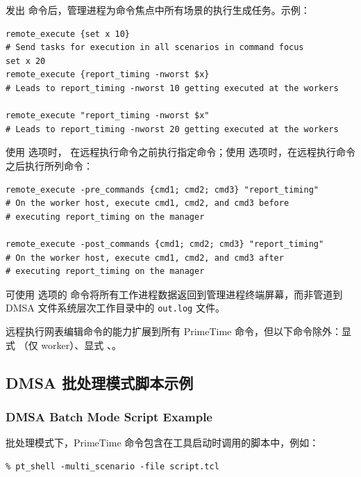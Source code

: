 发出  命令后，管理进程为命令焦点中所有场景的执行生成任务。示例：
\begin{lstlisting}
remote_execute {set x 10}
# Send tasks for execution in all scenarios in command focus
set x 20
remote_execute {report_timing -nworst $x}
# Leads to report_timing -nworst 10 getting executed at the workers

remote_execute "report_timing -nworst $x"
# Leads to report_timing -nworst 20 getting executed at the workers
\end{lstlisting}

使用  选项时， 在远程执行命令之前执行指定命令；使用  选项时，在远程执行命令之后执行所列命令：
\begin{lstlisting}
remote_execute -pre_commands {cmd1; cmd2; cmd3} "report_timing"
# On the worker host, execute cmd1, cmd2, and cmd3 before
# executing report_timing on the manager

remote_execute -post_commands {cmd1; cmd2; cmd3} "report_timing"
# On the worker host, execute cmd1, cmd2, and cmd3 after
# executing report_timing on the manager
\end{lstlisting}

可使用  选项的  命令将所有工作进程数据返回到管理进程终端屏幕，而非管道到 DMSA 文件系统层次工作目录中的 \texttt{out.log} 文件。

远程执行网表编辑命令的能力扩展到所有 PrimeTime 命令，但以下命令除外：显式 （仅 worker）、显式 、。


\subsection{DMSA 批处理模式脚本示例}
\subsubsection*{DMSA Batch Mode Script Example}

批处理模式下，PrimeTime 命令包含在工具启动时调用的脚本中，例如：
\begin{lstlisting}
% pt_shell -multi_scenario -file script.tcl
\end{lstlisting}

